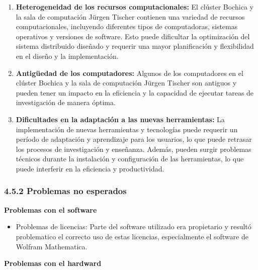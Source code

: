 \begin{spacing}{1.5}
  \begin{enumerate}
    \item \textbf{Heterogeneidad de los recursos computacionales:} El clúster
          Bochica y la sala de computación Jürgen Tischer contienen una
          variedad de
          recursos computacionales, incluyendo diferentes tipos de
          computadoras, sistemas
          operativos y versiones de software. Esto puede dificultar la
          optimización del
          sistema distribuido diseñado y requerir una mayor planificación y
          flexibilidad
          en el diseño y la implementación.
    \item \textbf{Antigüedad de los computadores:} Algunos de los computadores
          en el clúster Bochica y la sala de computación Jürgen Tischer son
          antiguos y
          pueden tener un impacto en la eficiencia y la capacidad de ejecutar
          tareas de
          investigación de manera óptima.
    \item \textbf{Dificultades en la adaptación a las nuevas herramientas:} La
          implementación de nuevas herramientas y tecnologías puede requerir un
          período
          de adaptación y aprendizaje para los usuarios, lo que puede retrasar
          los
          procesos de investigación y enseñanza. Además, pueden surgir
          problemas técnicos
          durante la instalación y configuración de las herramientas, lo que
          puede
          interferir en la eficiencia y productividad.
  \end{enumerate}

  \subsubsection{4.5.2 Problemas no esperados}

  \textbf{Problemas con el software}

  \begin{itemize}
    \item Problemas de licencias: Parte del software utilizado era
          propietario y resultó problematico el correcto uso de estas
          licencias,
          especialmente el software de Wolfram Mathematica.
  \end{itemize}

  \textbf{Problemas con el hardward}


\end{spacing}
